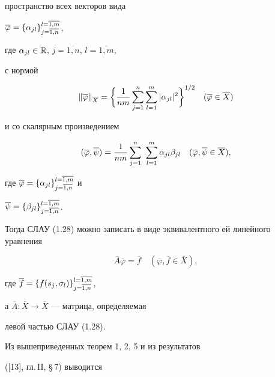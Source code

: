 пространство всех векторов вида


$\overline{\varphi }=\{\alpha _{jl}\}_{j=\overline{1,n}}^{l=\overline{1,m}}$,


где $\alpha _{jl}\in \Bbb R$, $j=\overline{1,n}$, $l=\overline{1,m}$,


с нормой


$$


\|\overline{\varphi}\|_{\overline{X}}=\bigg\{\frac{1}{nm}


\sum_{j=1}^n\sum_{l=1}^m|\alpha_{jl}|^2\bigg\}^{1/2}\quad


(\ol{\varphi}\in \overline{X})


$$


и со скалярным произведением


$$


(\ol{\vp},\ol{\psi}) = \frac{1}{nm}\sum_{j=1}^n\ \sum_{l=1}^m


\alpha_{jl}\beta_{jl}\quad (\ol{\vp},\ol{\psi}\in \ol{X}),


$$


где $\overline{\varphi}=\{\alpha_{jl}\}_{j=\overline{1,n}}^{l=\overline{1,m}}$ и 


$\overline{\psi} = \{\beta_{jl}\}_{j=\overline{1,n}}^{l=\overline{1,m}}$.


Тогда СЛАУ (1.28) можно записать в виде эквивалентного ей линейного уравнения


\begin{equation}


\overline{A}\overline{\varphi }=\overline{f}\quad 


(\overline{\varphi }, \overline{f}\in \overline{X}),


\end{equation}


где $\overline{f}=\{ f(s_j,\sigma _l)\}_{j=\overline{1,n}}^{l=\overline{1,m}}$, 


а $\overline{A}:\overline{X}\to \overline{X}$ --- матрица, определяемая 


левой частью СЛАУ (1.28).





Из вышеприведенных теорем 1, 2, 5 и из результатов


([13], гл.\,II, \S\,7) выводится





